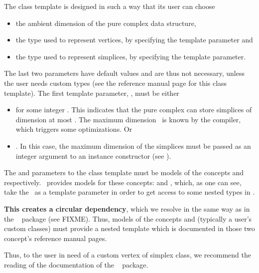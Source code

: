 {{The 
class template is designed in such a way that its user can choose
\begin{itemize}
\item the ambient dimension of the pure complex data structure,
\item the type used to represent vertices, by specifying the 
template parameter and
\item the type used to represent simplices, by specifying the
 template parameter.
\end{itemize}

The last two parameters have default values and are thus not necessary, unless
the user needs custom types (see the reference manual page for this class
template). The first template parameter, , must be either
\begin{itemize}
\item \ccPureGlobalScope{} for some integer \ad. This
indicates that the pure complex can store simplices of dimension at most
\ad. The maximum dimension \ad\ is known by the compiler, which
triggers some optimizations. Or
\item \ccPureGlobalScope{}. In this case, the maximum
dimension of the simplices must be passed as an integer argument to an instance
constructor (see ).
\end{itemize}

The  and  parameters to the class template
must be models of the concepts  and
 respectively. \cgal\ provides models for these
concepts:  and
, which, as one
can see, take the \tds\ as a template parameter in order to get access to
some nested types in \tds.

\textbf{This creates a circular dependency}, which we resolve in the same way
as in the \cgal\  package (see FIXME). Thus, models of
the concepts  and
 (typically a
user's custom classes) must provide a nested template  which
is documented in those two concept's reference manual pages.

\begin{ccAdvanced}
Thus, to the user in need of a custom vertex of simplex class, we recommend
the reading of the documentation of the \cgal\  package.
\end{ccAdvanced}

}}
